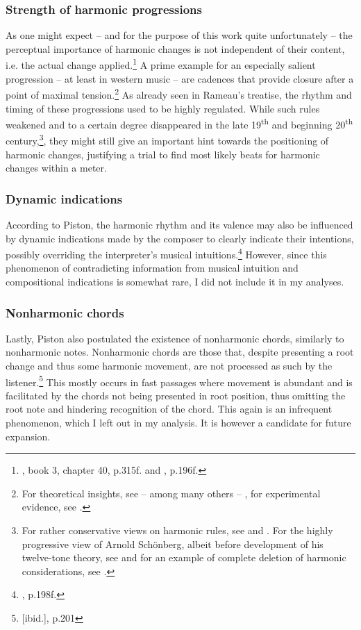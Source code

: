 \documentclass[a4paper,12pt]{report}
\begin{document}
\subsubsection{Strength of harmonic progressions}
As one might expect -- and for the purpose of this work quite unfortunately -- the perceptual importance of harmonic changes is not independent of their content, i.e. the actual change applied.\footnote{\cite{rameau1722traite}, book 3, chapter 40, p.315f. and \cite{piston1978harmony}, p.196f.} A prime example for an especially salient progression -- at least in western music -- are cadences that provide closure after a point of maximal tension.\footnote{For theoretical insights, see -- among many others -- \cite{jackendoff1983generative}, for experimental evidence, see \cite{bigand1999perceiving}.} As already seen in Rameau's treatise, the rhythm and timing of these progressions used to be highly regulated. While such rules weakened and to a certain degree disappeared in the late 19\textsuperscript{th} and beginning 20\textsuperscript{th} century,\footnote{For rather conservative views on harmonic rules, see \cite{riemann1893vereinfachte} and \cite{schenker1906harmonielehre}. For the highly progressive view of Arnold Sch\"onberg, albeit before development of his twelve-tone theory, see \cite{schonberg1922harmonielehre} and for an example of complete deletion of harmonic considerations, see \cite{schonberg1976stil}.}, they might still give an important hint towards the positioning of harmonic changes, justifying a trial to find most likely beats for harmonic changes within a meter.

\subsubsection{Dynamic indications}
According to Piston, the harmonic rhythm and its valence may also be influenced by dynamic indications made by the composer to clearly indicate their intentions, possibly overriding the interpreter's musical intuitions.\footnote{\cite{piston1978harmony}, p.198f.} However, since this phenomenon of contradicting information from musical intuition and compositional indications is somewhat rare, I did not include it in my analyses.

\subsubsection{Nonharmonic chords}
Lastly, Piston also postulated the existence of nonharmonic chords, similarly to nonharmonic notes. Nonharmonic chords are those that, despite presenting a root change and thus some harmonic movement, are not processed as such by the listener.\footnote{[ibid.], p.201} This mostly occurs in fast passages where movement is abundant and is facilitated by the chords not being presented in root position, thus omitting the root note and hindering recognition of the chord. This again is an infrequent phenomenon, which I left out in my analysis. It is however a candidate for future expansion.
\end{document}
